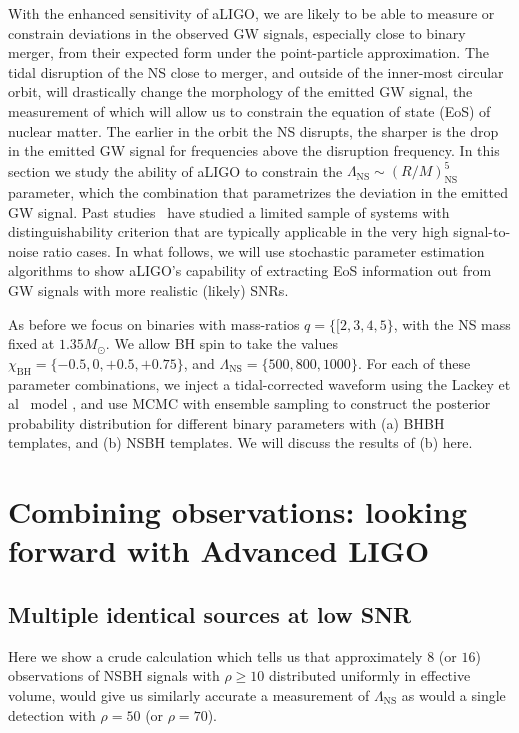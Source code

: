 \documentclass[aps,prd,amsmath,floats,floatfix, twocolumn,
superscriptaddress,nofootinbib,showpacs]{revtex4-1}
\newcommand{\lambdans}{\Lambda_\mathrm{NS}}
\newcommand{\chibh}{\chi_\mathrm{BH}}
\begin{document}
With the enhanced sensitivity of aLIGO, we are likely to be able to measure or
constrain deviations in the observed GW signals, especially close to binary
merger, from their expected form under the point-particle approximation.
The tidal disruption of the NS close to merger, and outside of the 
inner-most circular orbit, will drastically change the morphology of the emitted
GW signal, the measurement of which will allow us to constrain the equation 
of state (EoS) of nuclear matter.
The earlier in the orbit the NS disrupts, the sharper is the drop in the emitted
GW signal for frequencies above the disruption frequency. In this section we
study the ability of aLIGO to constrain the 
$\lambdans\sim \left(R/M\right)_\mathrm{NS}^5$ parameter, which
the combination that parametrizes the deviation in the emitted GW signal.
Past studies~\cite{}
have studied a limited sample of systems with distinguishability criterion that
are typically applicable in the very high signal-to-noise ratio cases. 
In what follows, we will use stochastic parameter estimation algorithms to show
aLIGO's capability of extracting EoS information out from GW signals with 
more realistic (likely) SNRs.

As before we focus on binaries with mass-ratios $q=\{[2,3,4,5\}$, with the NS mass
fixed at $1.35M_\odot$. We allow BH spin to take the values 
$\chibh=\{-0.5,0,+0.5,+0.75\}$, and $\lambdans=\{500, 800, 1000\}$. For each of these
parameter combinations, we inject a tidal-corrected waveform using the 
Lackey et al~\cite{} model , and use MCMC with ensemble sampling to construct the 
posterior probability distribution for different binary parameters with (a) BHBH
templates, and (b) NSBH templates. We will discuss the results of (b) here.




\pagebreak
\newpage
\FloatBarrier
\section{Combining observations: looking forward with Advanced LIGO}\label{s1:multiple_observations}
% 
% 
\subsection{Multiple identical sources at low SNR}\label{s2:identical_multiple}
% 
% 
Here we show a crude calculation which tells us that approximately $8$ (or $16$) observations
of NSBH signals with $\rho\geq 10$ distributed uniformly in effective volume, would
give us similarly accurate a measurement of $\lambdans$ as would a single detection
with $\rho=50$ (or $\rho=70$). 
\end{document}
